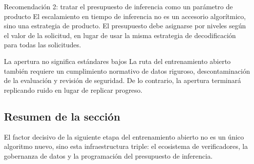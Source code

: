 \begin{importantbox}{Recomendación 2: tratar el presupuesto de inferencia como un parámetro de producto}
El escalamiento en tiempo de inferencia no es un accesorio algorítmico, sino una estrategia de producto. El presupuesto debe asignarse por niveles según el valor de la solicitud, en lugar de usar la misma estrategia de decodificación para todas las solicitudes.
\end{importantbox}

\begin{warningbox}{La apertura no significa estándares bajos}
La ruta del entrenamiento abierto también requiere un cumplimiento normativo de datos riguroso, descontaminación de la evaluación y revisión de seguridad. De lo contrario, la apertura terminará replicando ruido en lugar de replicar progreso.
\end{warningbox}

\subsection{Resumen de la sección}
El factor decisivo de la siguiente etapa del entrenamiento abierto no es un único algoritmo nuevo, sino esta infraestructura triple: el ecosistema de verificadores, la gobernanza de datos y la programación del presupuesto de inferencia.

